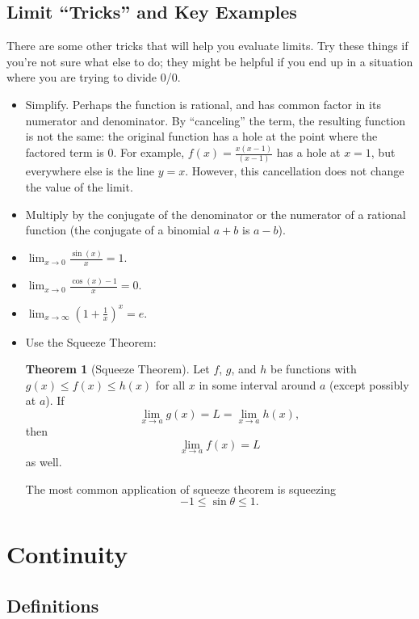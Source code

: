 \documentclass{article}
\theoremstyle{definition}
\newtheorem{theorem}{Theorem}[section]
\theoremstyle{definition}
\newenvironment{thm}[1][]{
\begin{tcolorbox}[colback=white!97!black, arc=0in]
\begin{theorem}[#1]
}{
\end{theorem}
\end{tcolorbox}
}
\begin{document}
\subsection{Limit ``Tricks'' and Key Examples}

There are some other tricks that will help you evaluate limits. Try these things if you're not sure what else to do; they might be helpful if you end up in a situation where you are trying to divide 0/0.
\begin{itemize}
\item Simplify. Perhaps the function is rational, and has common factor in its numerator and denominator. By ``canceling'' the term, the resulting function is not the same: the original function has a hole at the point where the factored term is 0. For example, $f(x)=\frac{x(x-1)}{(x-1)}$ has a hole at $x=1$, but everywhere else is the line $y=x$. However, this cancellation does not change the value of the limit.
\item Multiply by the conjugate of the denominator or the numerator of a rational function (the conjugate of a binomial $a+b$ is $a-b$).
\item $\displaystyle\lim_{x\to 0}\frac{\sin(x)}{x} = 1$.
\item $\displaystyle\lim_{x\to 0}\frac{\cos(x) - 1}{x} = 0$.
\item $\displaystyle\lim_{x\to\infty}\left(1+\frac{1}{x}\right)^x = e$.

\item Use the Squeeze Theorem:

\begin{thm}[Squeeze Theorem]
Let $f$, $g$, and $h$ be functions with $g(x)\leq f(x)\leq h(x)$ for all $x$ in some interval around $a$ (except possibly at $a$). If $$\lim_{x\to a}g(x)=L=\lim_{x\to a} h(x),$$ then $$\lim_{x\to a} f(x)=L$$
as well.
\end{thm}
The most common application of squeeze theorem is squeezing $$-1\leq \sin\theta \leq 1.$$
\end{itemize}


\section{Continuity}

\subsection{Definitions}
\end{document}
